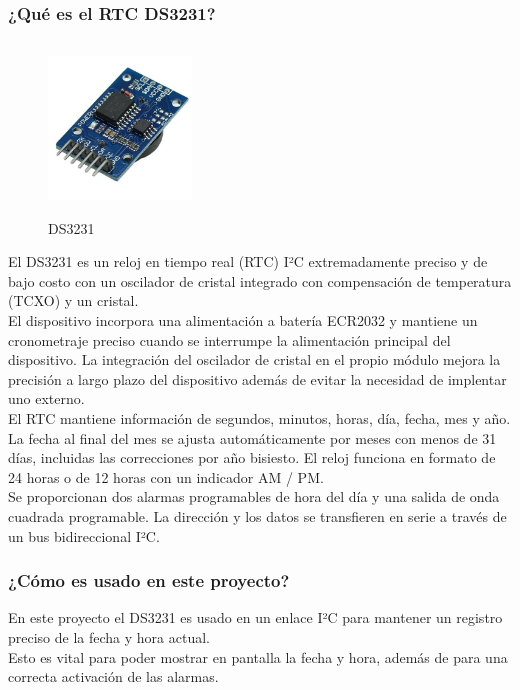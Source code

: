 \documentclass{article}
\begin{document}
		\subsubsection{¿Qué es el RTC DS3231?}
		\begin{figure}
			\centering
			\includegraphics[width= 1.5in, height= 1.8in]{DS3231.jpg}
			\caption{DS3231}	
		\end{figure}
		El DS3231 es un reloj en tiempo real (RTC) I²C extremadamente preciso y de bajo costo
		con un oscilador de cristal integrado con compensación de temperatura (TCXO) y un 
		cristal.\\ 
		El dispositivo incorpora una alimentación a batería ECR2032 y mantiene un 
		cronometraje preciso cuando se interrumpe la alimentación principal del dispositivo.
		La integración del oscilador de cristal en el propio módulo mejora la precisión a 
		largo plazo del dispositivo además de evitar la necesidad de implentar uno externo.\\
		El RTC mantiene información de segundos, minutos, horas, día, fecha, mes y año.
		La fecha al final del mes se ajusta automáticamente por meses con menos de 31 días,
		incluidas las correcciones por año bisiesto.
		El reloj funciona en formato de 24 horas o de 12 horas con un indicador AM / PM.\\
		Se proporcionan dos alarmas programables de hora del día y una salida de onda 
		cuadrada programable.
		La dirección y los datos se transfieren en serie a través de un bus bidireccional I²C.

		\subsubsection{¿Cómo es usado en este proyecto?}
		En este proyecto el DS3231 es usado en un enlace I²C para mantener un registro 
		preciso de la fecha y hora actual.\\
		Esto es vital para poder mostrar en pantalla la fecha y hora, además de para 
		una correcta activación de las alarmas.
\end{document}
